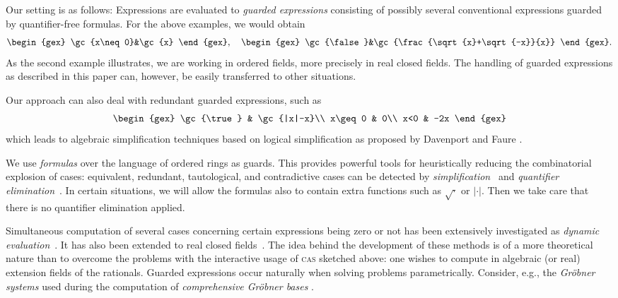 Our setting is as follows: Expressions are evaluated to {\em guarded
expressions} consisting of possibly several conventional expressions
guarded by quantifier-free formulas. For the above examples, we would
obtain
\[
\begin{gex}
\gc{x\neq0}&\gc{x}
\end{gex},\quad
\begin{gex}
\gc{\false}&\gc{\frac{\sqrt{x}+\sqrt{-x}}{x}}
\end{gex}.
\]
As the second example illustrates, we are working in ordered fields,
more precisely in real closed fields. The handling of guarded
expressions as described in this paper can, however, be easily
transferred to other situations.

Our approach can also deal with redundant guarded expressions, such as
\[
\begin{gex}
\gc{\true} & \gc{|x|-x}\\
x\geq0 & 0\\
x<0 & -2x
\end{gex}
\]
which leads to algebraic simplification techniques based on logical
simplification as proposed by Davenport and
Faure \cite{DavenportFaure:94}.

We use {\em formulas} over the language of ordered rings as guards.
This provides powerful tools for heuristically reducing the
combinatorial explosion of cases: equivalent, redundant, tautological,
and contradictive cases can be detected by {\em
simplification}~\cite{Dolzmann:97b} and {\em quantifier
elimination}~\cite{Tarski:48,Collins:75,Weispfenning:88,LoosWeispfenning:93,Weispfenning:96,Weispfenning:94}.
In certain situations, we will allow the formulas also to contain
extra functions such as $\sqrt{\cdot}$ or $|\cdot|$. Then we take care
that there is no quantifier elimination applied.

Simultaneous computation of several cases concerning certain
expressions being zero or not has been extensively investigated as
{\em dynamic
evaluation}~\cite{GomezDiaz:93,DuvalReynaud:94,DuvalReynaud:94a,
BroadberryGomezDiazWatt:95}. It has also been extended to real closed
fields~\cite{DuvalGonzalesVega:93}. The idea behind the development of
these methods is of a more theoretical nature than to overcome the
problems with the interactive usage of \textsc{cas} sketched above: one
wishes to compute in algebraic (or real) extension fields of the
rationals. Guarded expressions occur naturally when solving problems
parametrically. Consider, e.g., the {\em Gr\"obner systems} used
during the computation of {\em comprehensive Gr\"obner bases}
\cite{Weispfenning:92}.

